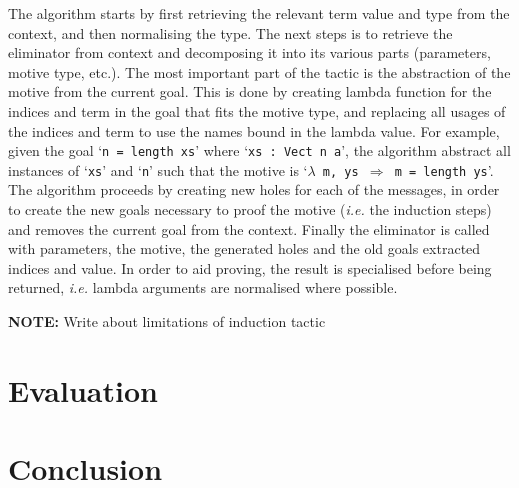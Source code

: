 \documentclass[a4paper]{article}%
\begin{document}
The algorithm starts by first retrieving the relevant term value and type from the context, and then normalising the type. The next steps is to retrieve the eliminator from context and decomposing it into its various parts
(parameters, motive type, etc.). The most important part of the tactic is the abstraction of the motive from the current goal. This is done by creating lambda function for the indices and term in the goal that fits the motive type,
and replacing all usages of the indices and term to use the names bound in the lambda value. For example, given the goal `\texttt{n = length xs}' where `\texttt{xs : Vect n a}', the algorithm abstract all instances of `\texttt{xs}' and `\texttt{n}' such that
the motive is `\texttt{$\lambda$ m, ys $\Rightarrow$ m = length ys}'.
The algorithm proceeds by creating new holes for each of the messages, in order to create the new goals necessary to proof the motive (\textit{i.e.} the induction steps) and removes the current goal from the context.
Finally the eliminator is called with parameters, the motive, the generated holes and the old goals extracted indices and value. In order to aid proving, the result is specialised before being returned, \textit{i.e.} lambda arguments are normalised
where possible.

\textbf{NOTE:} Write about limitations of induction tactic
\section{Evaluation}
\label{sec:Evaluation}
\section{Conclusion}
\label{sec:Conclusion}


\pagebreak
\appendix
\end{document}
